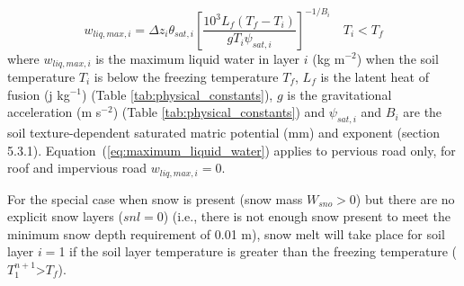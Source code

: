 \documentclass[12pt,authoryear]{elsarticle}
\numberwithin{equation}{section} %
\begin{document}
\begin{equation}
\label{eq:maximum_liquid_water}
w_{liq,max,i}=\Delta z_{i}\theta_{sat,i}\left[\frac{10^3L_{f}(T_{f}-T_{i})}{gT_{i}\psi_{sat,i}}\right]^{-1/B_{i}} \quad T_{i} < T_{f}
\end{equation}
where $w_{liq,max,i}$ is the maximum liquid water in layer $i$ (kg m$^{-2}$) when the soil temperature $T_{i}$ is below the freezing temperature $T_{f}$, $L_{f}$ is the latent heat of fusion (j kg$^{-1}$) (Table \ref{tab:physical_constants}), $g$ is the gravitational acceleration (m s$^{-2}$) (Table \ref{tab:physical_constants}) and $\psi_{sat,i}$ and $B_{i}$ are the soil
texture-dependent saturated matric potential (mm) and \cite{clappEmpiricalEquationsSoil1978} exponent (section 5.3.1). Equation~(\ref{eq:maximum_liquid_water}) applies to pervious road only, for roof and impervious road $w_{liq,max,i}=$0.

For the special case when snow is present (snow mass $W_{sno}>$0) but there are no explicit snow layers ($snl=$0) (i.e., there is not enough snow present to meet the minimum snow depth requirement of 0.01 m), snow melt will take place for soil layer $i=$1 if the soil layer temperature is greater than the freezing temperature ($T_{1}^{n+1}$>$T_{f}$).
\end{document}
